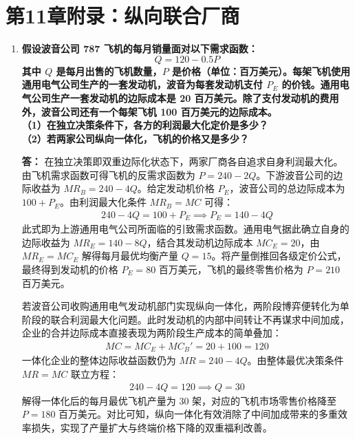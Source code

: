 	\section{第11章附录：纵向联合厂商}
	\begin{enumerate}[label=\textbf{\arabic*.}, leftmargin=*]
		\item \textbf{假设波音公司 787 飞机的每月销量面对以下需求函数：$$Q = 120 - 0.5P$$其中 $Q$ 是每月出售的飞机数量，$P$ 是价格（单位：百万美元）。每架飞机使用通用电气公司生产的一套发动机，波音为每套发动机支付 $P_E$ 的价钱。通用电气公司生产一套发动机的边际成本是 20 百万美元。除了支付发动机的费用外，波音公司还有一个每架飞机 100 百万美元的边际成本。\\（1）在独立决策条件下，各方的利润最大化定价是多少？\\（2）若两家公司纵向一体化，飞机的价格又是多少？}
		
		\textbf{答：}
		在独立决策即双重边际化状态下，两家厂商各自追求自身利润最大化。由飞机需求函数可得飞机的反需求函数为 $P = 240 - 2Q$。下游波音公司的边际收益为 $MR_B = 240 - 4Q$。给定发动机价格 $P_E$，波音公司的总边际成本为 $100 + P_E$。由利润最大化条件 $MR_B = MC$ 可得：
		\[
		\begin{aligned}
			240 - 4Q = 100 + P_E \implies P_E = 140 - 4Q
		\end{aligned}
		\]
		此式即为上游通用电气公司所面临的引致需求函数。通用电气据此确立自身的边际收益为 $MR_E = 140 - 8Q$，结合其发动机边际成本 $MC_E = 20$，由 $MR_E = MC_E$ 解得每月最优均衡产量 $Q = 15$。将产量倒推回各级定价公式，最终得到发动机的价格 $P_E = 80$ 百万美元，飞机的最终零售价格为 $P = 210$ 百万美元。
		
		若波音公司收购通用电气发动机部门实现纵向一体化，两阶段博弈便转化为单阶段的联合利润最大化问题。此时发动机的内部中间转让不再谋求中间加成，企业的合并边际成本直接表现为两阶段生产成本的简单叠加：
		\[
		\begin{aligned}
			MC = MC_E + MC_B' = 20 + 100 = 120
		\end{aligned}
		\]
		一体化企业的整体边际收益函数仍为 $MR = 240 - 4Q$。由整体最优决策条件 $MR = MC$ 联立方程：
		\[
		\begin{aligned}
			240 - 4Q = 120 \implies Q = 30
		\end{aligned}
		\]
		解得一体化后的每月最优飞机产量为 30 架，对应的飞机市场零售价格降至 $P = 180$ 百万美元。对比可知，纵向一体化有效消除了中间加成带来的多重效率损失，实现了产量扩大与终端价格下降的双重福利改善。
		

\end{enumerate}
